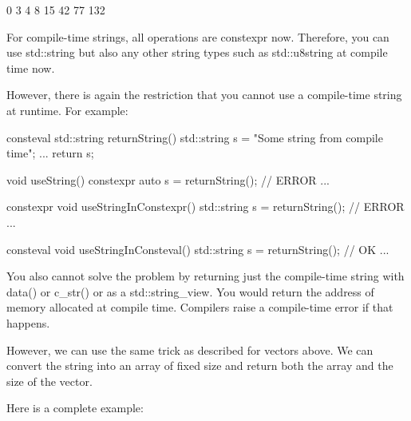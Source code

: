 \begin{shell}
0 3 4 8 15 42 77 132
\end{shell}


For compile-time strings, all operations are constexpr now. Therefore, you can use std::string but also any other string types such as std::u8string at compile time now.

However, there is again the restriction that you cannot use a compile-time string at runtime. For example:

\begin{cpp}
consteval std::string returnString()
{
	std::string s = "Some string from compile time";
	...
	return s;
}

void useString()
{
	constexpr auto s = returnString(); // ERROR
	...
}

constexpr void useStringInConstexpr()
{
	std::string s = returnString(); // ERROR
	...
}

consteval void useStringInConsteval()
{
	std::string s = returnString(); // OK
	...
}
\end{cpp}

You also cannot solve the problem by returning just the compile-time string with data() or c\_str() or as a std::string\_view. You would return the address of memory allocated at compile time. Compilers raise a compile-time error if that happens.

However, we can use the same trick as described for vectors above. We can convert the string into an array of fixed size and return both the array and the size of the vector.

Here is a complete example:


